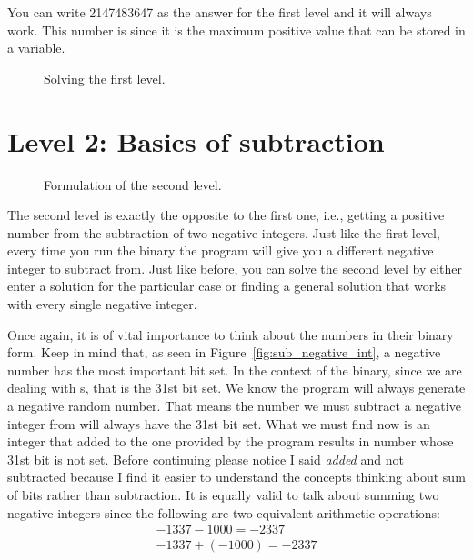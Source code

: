 You can write 2147483647 as the answer for the first level and it will always work. This number is  since it is the maximum positive value that can be stored in a  variable.
\begin{figure}
	\caption{Solving the first level.}
	\label{fig:solved_level1}
\end{figure}
\clearpage
\section{Level 2: Basics of subtraction}

\begin{figure}[!htbp]
	\caption{Formulation of the second level.}
	\label{fig:intro_level2}
\end{figure}

The second level is exactly the opposite to the first one, i.e., getting a positive number from the subtraction of two negative integers. Just like the first level, every time you run the binary the program will give you a different negative integer to subtract from. Just like before, you can solve the second level by either enter a solution for the particular case or finding a general solution that works with every single negative integer. 

Once again, it is of vital importance to think about the numbers in their binary form. Keep in mind that, as seen in Figure~\ref{fig:sub_negative_int}, a negative number has the most important bit set. In the context of the binary, since we are dealing with s, that is the 31st bit set. We know the program will always generate a negative random number. That means the number we must subtract a negative integer from will always have the 31st bit set. What we must find now is an integer that added to the one provided by the program results in  number whose 31st bit is not set. Before continuing please notice I said \textit{added} and not subtracted because I find it easier to understand the concepts thinking about sum of bits rather than subtraction. It is equally valid to talk about summing two negative integers since the following are two equivalent arithmetic operations:
\begin{align*}
-1337 - 1000 = -2337\\
-1337 + (-1000) = -2337
\end{align*}

